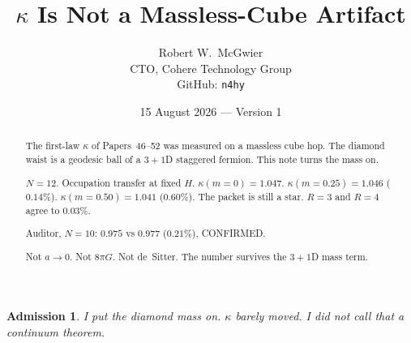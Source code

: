 \documentclass[11pt]{article}
\title{\textbf{$\kappa$ Is Not a Massless-Cube Artifact}}
\author{Robert W.\ McGwier\\
\small CTO, Cohere Technology Group\\
\small GitHub: \texttt{n4hy}}
\date{15 August 2026 --- Version 1}
\newtheorem*{admission}{Admission}
\begin{document}
\maketitle

\begin{abstract}
\noindent
The first-law $\kappa$ of Papers~46--52 was measured on a
massless cube hop. The diamond waist is a geodesic ball
of a $3+1$D staggered fermion. This note turns the mass on.

$N=12$. Occupation transfer at fixed $H$.
$\kappa(m=0)=1.047$. $\kappa(m=0.25)=1.046$ ($0.14\%$).
$\kappa(m=0.50)=1.041$ ($0.60\%$). The packet is still a
star. $R=3$ and $R=4$ agree to $0.03\%$.

Auditor, $N=10$: $0.975$ vs $0.977$ ($0.21\%$), CONFIRMED.

Not $a\to 0$. Not $8\pi G$. Not de~Sitter. The number
survives the $3+1$D mass term.
\end{abstract}

\begin{admission}
I put the diamond mass on. $\kappa$ barely moved. I did
not call that a continuum theorem.
\end{admission}
\end{document}
